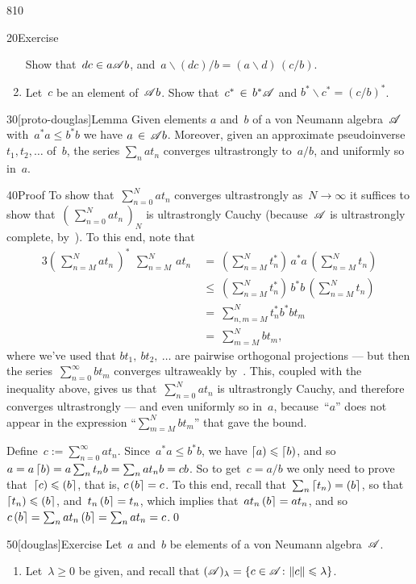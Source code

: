 \begin{parsec}{810}
\begin{point}{20}{Exercise}
\begin{enumerate}
Show that~$dc\in a\mathscr{A} b$,
and~$a\backslash (dc) / b  = (a\backslash d)\,(c/b)$.
\item
Let~$c$ be an element of~$\mathscr{A} b$.
Show that~$c^* \,\in\, b^* \mathscr{A}$
and $b^*\backslash c^* = (c/b)^*$.
\end{enumerate}%
\spacingfix%
\end{point}%
\begin{point}{30}[proto-douglas]{Lemma}%
Given elements $a$ and~$b$ of a von Neumann algebra~$\mathscr{A}$
with~$a^*a \leq b^*b$
we have $a\,\in\, \mathscr{A} b$.
Moreover,
given an approximate pseudoinverse $t_1,t_2,\dotsc$
of~$b$,
the series $\sum_nat_n$ converges ultrastrongly to~$a/b$,%
and uniformly so in~$a$.
\begin{point}{40}{Proof}%
To show that~$\sum_{n=0}^N at_n$
converges ultrastrongly as~$N\to \infty$
it suffices
to show that~$(\,\sum_{n=0}^N at_n\,)_N$
is ultrastrongly Cauchy
(because~$\mathscr{A}$ is ultrastrongly complete, by~).
To this end, note that
\begin{alignat*}{3}
\textstyle 
(\, \sum_{n=M}^N at_n\,)^*\ \,\sum_{n=M}^N\,at_n
\ &= \textstyle\ (\sum_{n=M}^Nt_n^*) \,a^*a\, (\sum_{n=M}^N t_n)
\\
\ &\leq\ \textstyle 
 (\sum_{n=M}^N t_n^*) \,b^*b\, (\sum_{n=M}^Nt_n)
\\
\ &= \ \textstyle 
\sum_{n,m=M}^N
t_n^*b^*bt_m 
\\
\ &=\ \textstyle 
\sum_{m=M}^N
bt_m,
\end{alignat*}
where we've used that
$bt_1,\ bt_2,\ \dotsc$
are pairwise orthogonal projections
--- but then the series~$\sum_{n=0}^\infty bt_m$
converges ultraweakly by~.
This, coupled with the
inequality above,
gives us that~$\sum_{n=0}^N at_n$
is ultrastrongly Cauchy,
and therefore converges ultrastrongly --- 
and even uniformly so in~$a$,
because~``$a$'' does not appear in
the expression
``$\sum_{m=M}^N bt_m$'' that gave the bound.

Define~$c:=\sum_{n=0}^\infty at_n$.
Since~$a^*a \leq b^*b$,
we have $\left\lceil a\right)\leqslant \left\lceil b\right)$,
and so~$a=a\left\lceil b\right) = a\sum_n t_n b = \sum_n at_n b = cb$. 
So to get~$c=a/b$
we only need to prove that~$\left\lceil c\right)\leqslant \left(b\right\rceil$,
that is, $c\left(b\right\rceil=c$.
To this end,
recall that~$\sum_n \left\lceil t_n\right)=\left(b\right\rceil$,
so that~$\left\lceil t_n\right)\leqslant \left(b\right\rceil$,
and~$t_n\left(b\right\rceil=t_n$,
which implies
that~$at_n\left(b\right\rceil=at_n$,
and so~$c\left(b\right\rceil=\sum_n at_n\left(b\right\rceil
= \sum_n at_n=c$.\qed
\end{point}
\end{point}
\begin{point}{50}[douglas]{Exercise}%
Let~$a$ and~$b$ be elements of a von Neumann algebra~$\mathscr{A}$.
\begin{enumerate}
\item
Let~$\lambda\geq 0$ be given,
and recall that $(\mathscr{A})_\lambda 
= \{c\in\mathscr{A}\colon \|c\|\leqslant\lambda\}$.


\end{enumerate}
\end{point}
\end{parsec}
